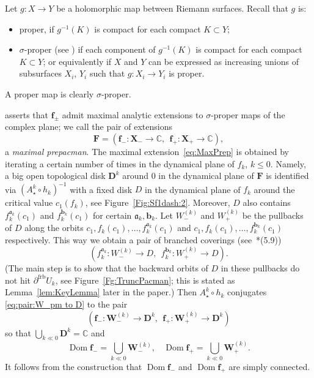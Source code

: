\documentclass{amsart}
\newcommand{\Dom}{\operatorname {Dom}}
\renewcommand{\sp}{{\ \ }}
\newcommand{\1}{{\mathbb 1 }}
\newcommand{\bF}{{\mathbf F}}
\newcommand{\bX}{{\mathbf X}}
\newcommand{\bW}{{\mathbf W}}
\newcommand{\bD}{{\mathbf D}}
\newcommand{\bbf}{{\mathbf f}}
\newcommand{\str}{{\star}}
\renewcommand{\aa}{\mathfrak{a}}
\newcommand{\bb}{{\mathbf b}}
\newcommand\frb{{\operatorname{frb}}}
\newcommand{\C}{\mathbb{C}}
\theoremstyle{remark}
\numberwithin{equation}{section}
\theoremstyle{definition}
\theoremstyle{nonumberbreak}
\begin{document}
Let $g : X \to Y$ be a holomorphic map between Riemann surfaces.  
Recall that $g$ is:
\begin{itemize}
\item proper, if $g^{-1}(K)$ is compact for each compact $K \subset Y$;
\item $\sigma$-proper (see \cite[\S 8]{McM3}) if each component of $g^{-1}(K)$ is compact for each compact $K \subset Y$; or equivalently if $X$ and $Y$ can be expressed as increasing unions of subsurfaces $X_i$, $Y_i$ such that $g : X_i \to Y_i$ is proper.
\end{itemize}
\noindent A proper map is clearly $\sigma$-proper.

\cite[Theorem 5.5]{DLS} asserts that $\bbf_{\pm}$ admit maximal analytic extensions to $\sigma$-proper maps of the complex plane; we call the pair of extensions
\begin{equation}
\label{eq:MaxPrep}
\bF= (\bbf_-\colon  \bX_-\to \C,\sp \bbf_+\colon  \bX_+\to \C),
\end{equation}
a \emph{maximal prepacman}. The maximal extension~\eqref{eq:MaxPrep} is obtained by iterating a certain number of times in the dynamical plane of $f_k$, $k\le0$.  Namely, a big open topological disk $\bD^k$ around $0$ in the dynamical plane of $\bF$ is identified via $(A_\str^k \circ h_k)^{-1}$ with a fixed disk $D$ in the dynamical plane of $f_k$ around the critical value $c_1(f_k)$, see Figure~\ref{Fig:Sf1dash:2}. Moreover, $D$ also contains $f_k^{\aa_k}(c_1)$ and $f_k^{\bb_k}(c_1)$ for certain $\aa_k,\bb_k$. Let $W_-^{(k)}$ and $W_+^{(k)}$ be the pullbacks of $D$ along the orbits $c_1,f_k(c_1),\dots, f_k^{\aa_k}(c_1)$ and  $c_1,f_k(c_1),\dots, f_k^{\bb_k}(c_1)$ respectively. This way we obtain a pair of branched coverings (see~\cite{DLS}*{(5.9)}) 
\begin{equation}
\label{eq:pair:W_pm to D}
(f_k^{\aa_k}\colon  W_-^{(k)} \to D,\sp  f_k^{\bb_k}\colon  W_+^{(k)}\to D).
\end{equation}
(The main step is to show that the backward orbits of $D$ in these pullbacks do not hit $\partial^\frb U_k$, see Figure~\ref{Fg:TruncPacman}; this is {\cite[Key Lemma 4.8]{DLS}} stated as Lemma~\ref{lem:KeyLemma} later in the paper.) Then $A_\str^k \circ h_k$ conjugates \eqref{eq:pair:W_pm to D} to the pair
\begin{equation}
\label{eq:pair:bW_pm to bD^k}
(\bbf_- \colon  \bW_-^{(k)} \to \bD^k,\sp  \bbf_+\colon \bW_+^{(k)}\to \bD^k)
\end{equation}
so that $\bigcup_{k\ll 0} \bD^k=\C$ and
\[
\Dom \bbf_- = \bigcup_{k \ll 0} \bW_-^{(k)},\sp\sp  \Dom \bbf_+ = \bigcup_{k \ll 0} \bW_+^{(k)}.
\]
It follows from the construction that $\Dom \bbf_-$ and $\Dom \bbf_+$ are simply connected. 
\end{document}
